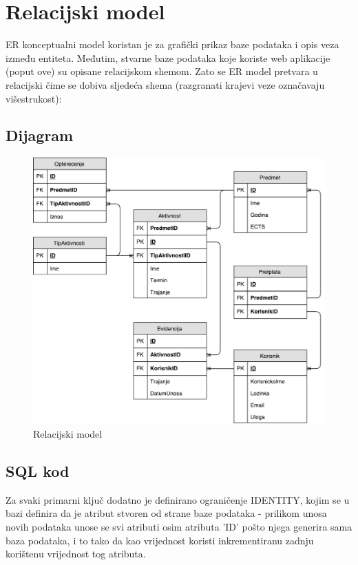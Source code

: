 \documentclass[times, utf8, zavrsni]{fer}
\begin{document}
\section{Relacijski model}

ER konceptualni model koristan je za grafički prikaz baze podataka i opis veza između entiteta. Međutim, stvarne baze podataka koje koriste web aplikacije (poput ove) su opisane relacijskom shemom. Zato se ER model pretvara u relacijski čime se dobiva sljedeća shema (razgranati krajevi veze označavaju višestrukost):

\subsection{Dijagram}

\begin{figure}[H]
\centering
\includegraphics[scale=0.5]{img/relacijski-model.pdf}
\caption{Relacijski model}
\label{fig:relacijski-model}
\end{figure}

\subsection{SQL kod}

Za svaki primarni ključ dodatno je definirano ograničenje IDENTITY, kojim se u bazi definira da je atribut stvoren od strane baze podataka - prilikom unosa novih podataka unose se svi atributi osim atributa 'ID' pošto njega generira sama baza podataka, i to tako da kao vrijednost koristi inkrementiranu zadnju korištenu vrijednost tog atributa.
\end{document}
